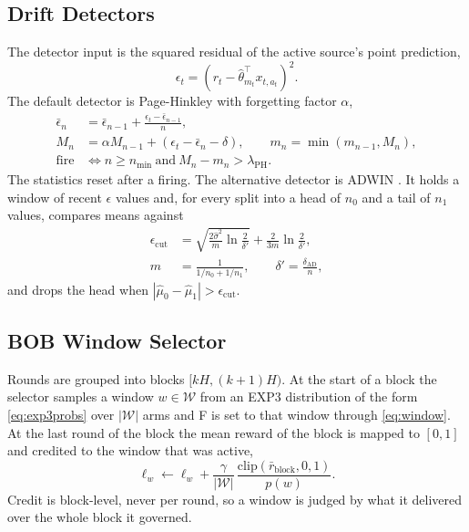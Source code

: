 \subsection{Drift Detectors}
The detector input is the squared residual of the active source's point prediction,
\begin{equation}
\epsilon_t=(r_t-\hat\theta_{m_t}^\top x_{t,a_t})^2.
\label{eq:resid}
\end{equation}
The default detector is Page-Hinkley \cite{page1954} with forgetting factor $\alpha$,
\begin{align}
\bar\epsilon_n&=\bar\epsilon_{n-1}+\frac{\epsilon_t-\bar\epsilon_{n-1}}{n},\nonumber\\
M_n&=\alpha M_{n-1}+(\epsilon_t-\bar\epsilon_n-\delta),\qquad
m_n=\min(m_{n-1},M_n),\nonumber\\
\text{fire}&\iff n\ge n_{\min}\ \text{and}\ M_n-m_n>\lambda_{\mathrm{PH}}.
\label{eq:ph}
\end{align}
The statistics reset after a firing. The alternative detector is ADWIN \cite{bifet2007}. It holds a window of recent $\epsilon$ values and, for every split into a head of $n_0$ and a tail of $n_1$ values, compares means against
\begin{align}
\epsilon_{\mathrm{cut}}&=\sqrt{\frac{2\hat\sigma^2}{m}\ln\frac{2}{\delta'}}+\frac{2}{3m}\ln\frac{2}{\delta'},\nonumber\\
m&=\frac{1}{1/n_0+1/n_1},\qquad \delta'=\frac{\delta_{\mathrm{AD}}}{n},
\label{eq:adwin}
\end{align}
and drops the head when $|\hat\mu_0-\hat\mu_1|>\epsilon_{\mathrm{cut}}$.

\subsection{BOB Window Selector}
Rounds are grouped into blocks $[kH,(k+1)H)$. At the start of a block the selector samples a window $w\in\mathcal W$ from an EXP3 distribution of the form \eqref{eq:exp3probs} over $|\mathcal W|$ arms and F is set to that window through \eqref{eq:window}. At the last round of the block the mean reward of the block is mapped to $[0,1]$ and credited to the window that was active,
\begin{equation}
\ell_{w}\leftarrow\ell_{w}+\frac{\gamma}{|\mathcal W|}\,\frac{\mathrm{clip}(\bar r_{\mathrm{block}},0,1)}{p(w)}.
\label{eq:bob}
\end{equation}
Credit is block-level, never per round, so a window is judged by what it delivered over the whole block it governed.

